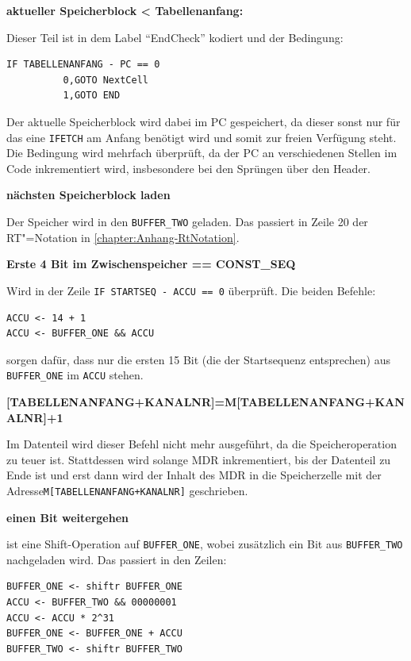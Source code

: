 \textbf{aktueller Speicherblock < Tabellenanfang:}

Dieser Teil ist in dem Label "`EndCheck"' kodiert und der Bedingung:

\begin{verbatim}
IF TABELLENANFANG - PC == 0
          0,GOTO NextCell
          1,GOTO END
\end{verbatim}

Der aktuelle Speicherblock wird dabei im PC gespeichert, da dieser sonst nur für das eine \texttt{IFETCH} am Anfang benötigt wird und somit zur freien Verfügung steht.\\
Die Bedingung wird mehrfach überprüft, da der PC an verschiedenen Stellen im Code inkrementiert wird, insbesondere bei den Sprüngen über den Header.

\textbf{nächsten Speicherblock laden}

Der Speicher wird in den \texttt{BUFFER\_TWO} geladen. Das passiert in Zeile 20 der RT"=Notation in \autoref{chapter:Anhang-RtNotation}.

\textbf{Erste 4 Bit im Zwischenspeicher == CONST\_SEQ}

Wird in der Zeile \texttt{IF STARTSEQ - ACCU == 0} überprüft. Die beiden Befehle:

\begin{verbatim}
ACCU <- 14 + 1
ACCU <- BUFFER_ONE && ACCU
\end{verbatim}

sorgen dafür, dass nur die ersten 15 Bit (die der Startsequenz entsprechen) aus \texttt{BUFFER\_ONE} im \texttt{ACCU} stehen.

\textbf{[TABELLENANFANG+KANALNR]=M[TABELLENANFANG+KANALNR]+1}

Im Datenteil wird dieser Befehl nicht mehr ausgeführt, da die Speicheroperation zu teuer ist. Stattdessen wird solange MDR inkrementiert, bis der Datenteil zu Ende ist und erst dann wird der Inhalt des MDR in die Speicherzelle mit der Adresse\linebreak \texttt{M[TABELLENANFANG+KANALNR]} geschrieben.

\textbf{einen Bit weitergehen}

ist eine Shift-Operation auf \texttt{BUFFER\_ONE}, wobei zusätzlich ein Bit aus \texttt{BUFFER\_TWO} nachgeladen wird. Das passiert in den Zeilen:

\begin{verbatim}
BUFFER_ONE <- shiftr BUFFER_ONE
ACCU <- BUFFER_TWO && 00000001
ACCU <- ACCU * 2^31
BUFFER_ONE <- BUFFER_ONE + ACCU
BUFFER_TWO <- shiftr BUFFER_TWO
\end{verbatim}

